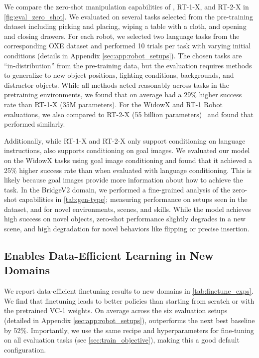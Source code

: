 We compare the zero-shot manipulation capabilities of \method{}, RT-1-X, and RT-2-X in \cref{fig:eval_zero_shot}. We evaluated on several tasks selected from the pre-training dataset including picking and placing, wiping a table with a cloth, and opening and closing drawers. For each robot, we selected two language tasks from the corresponding OXE dataset and performed 10 trials per task with varying initial conditions (details in Appendix \ref{sec:app:robot_setups}). The chosen tasks are ``in-distribution'' from the pre-training data, but the evaluation requires methods to generalize to new object positions, lighting conditions, backgrounds, and distractor objects. While all methods acted reasonably across tasks in the pretraining environments, we found that on average \method{} had a 29\% higher success rate than RT-1-X (35M parameters). For the WidowX and RT-1 Robot evaluations, we also compared to RT-2-X (55 billion parameters)~\citep{zitkovich2023rt} and found that \method{} performed similarly.


Additionally, while RT-1-X and RT-2-X only support conditioning on language instructions, \method{} also supports conditioning on goal images. We evaluated our model on the WidowX tasks using goal image conditioning and found that it achieved a 25\% higher success rate than when evaluated with language conditioning. This is likely because goal images provide more information about how to achieve the task. In the BridgeV2 domain, we performed a fine-grained analysis of the zero-shot capabilities in \cref{tab:gen-type}; measuring performance on setups seen in the dataset, and for novel environments, scenes, and skills. While the \method{} model achieves high success on novel objects, zero-shot performance slightly degrades in a new scene, and high degradation for novel behaviors like flipping or precise insertion.


\subsection{\method{} Enables Data-Efficient Learning in New Domains}
\label{sec:exp_finetuning}


We report data-efficient finetuning results to new domains in \cref{tab:finetune_exps}. We find that finetuning \method{} leads to better policies than starting from scratch or with the pretrained VC-1 weights. On average across the six evaluation setups (detailed in Appendix \ref{sec:app:robot_setups}), \method{} outperforms the next best baseline by 52\%. Importantly, we use the same  recipe and hyperparameters for fine-tuning \method{} on all evaluation tasks (see \cref{sec:train_objective}),
making this a good default configuration.

